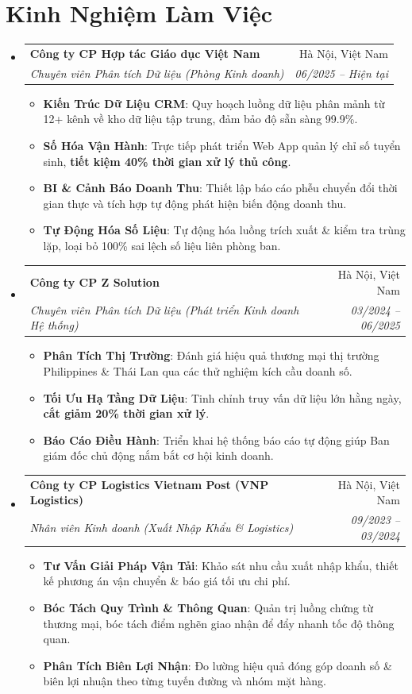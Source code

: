 \documentclass[letterpaper,11pt]{article}
\makeatletter
\newcommand{\resumeItem}[1]{
  \item\small{
    {#1 \vspace{1pt}}
  }
}
\newcommand{\resumeSubheading}[4]{
  \vspace{2pt}\item
    \begin{tabular*}{\textwidth}[t]{l@{\extracolsep{\fill}}r}
      \textbf{#1} & #2 \\
      \textit{\small#3} & \textit{\small #4} \\
    \end{tabular*}\vspace{-2pt}
}
\newcommand{\resumeSubHeadingListStart}{\begin{itemize}[leftmargin=0.15in, label={}]}
\newcommand{\resumeSubHeadingListEnd}{\end{itemize}}
\newcommand{\resumeItemListStart}{\begin{itemize}[leftmargin=0.15in, itemsep=2.5pt, topsep=2pt, parsep=1.5pt]}
\newcommand{\resumeItemListEnd}{\end{itemize}\vspace{2pt}}
\makeatother
\begin{document}
\section*{Kinh Nghiệm Làm Việc}
  \resumeSubHeadingListStart
    \resumeSubheading
      {Công ty CP Hợp tác Giáo dục Việt Nam}{Hà Nội, Việt Nam}
      {Chuyên viên Phân tích Dữ liệu (Phòng Kinh doanh)}{06/2025 -- Hiện tại}
      \resumeItemListStart
      \resumeItem{\textbf{Kiến Trúc Dữ Liệu CRM}: Quy hoạch luồng dữ liệu phân mảnh từ 12+ kênh về kho dữ liệu tập trung, đảm bảo độ sẵn sàng 99.9\%.}
      \resumeItem{\textbf{Số Hóa Vận Hành}: Trực tiếp phát triển Web App quản lý chỉ số tuyển sinh, \textbf{tiết kiệm 40\% thời gian xử lý thủ công}.}
      \resumeItem{\textbf{BI \& Cảnh Báo Doanh Thu}: Thiết lập báo cáo phễu chuyển đổi thời gian thực và tích hợp tự động phát hiện biến động doanh thu.}
      \resumeItem{\textbf{Tự Động Hóa Số Liệu}: Tự động hóa luồng trích xuất \& kiểm tra trùng lặp, loại bỏ 100\% sai lệch số liệu liên phòng ban.}
      \resumeItemListEnd
    \resumeSubheading
      {Công ty CP Z Solution}{Hà Nội, Việt Nam}
      {Chuyên viên Phân tích Dữ liệu (Phát triển Kinh doanh Hệ thống)}{03/2024 -- 06/2025}
      \resumeItemListStart
      \resumeItem{\textbf{Phân Tích Thị Trường}: Đánh giá hiệu quả thương mại thị trường Philippines \& Thái Lan qua các thử nghiệm kích cầu doanh số.}
      \resumeItem{\textbf{Tối Ưu Hạ Tầng Dữ Liệu}: Tinh chỉnh truy vấn dữ liệu lớn hằng ngày, \textbf{cắt giảm 20\% thời gian xử lý}.}
      \resumeItem{\textbf{Báo Cáo Điều Hành}: Triển khai hệ thống báo cáo tự động giúp Ban giám đốc chủ động nắm bắt cơ hội kinh doanh.}
      \resumeItemListEnd
    \resumeSubheading
      {Công ty CP Logistics Vietnam Post (VNP Logistics)}{Hà Nội, Việt Nam}
      {Nhân viên Kinh doanh (Xuất Nhập Khẩu \& Logistics)}{09/2023 -- 03/2024}
      \resumeItemListStart
      \resumeItem{\textbf{Tư Vấn Giải Pháp Vận Tải}: Khảo sát nhu cầu xuất nhập khẩu, thiết kế phương án vận chuyển \& báo giá tối ưu chi phí.}
      \resumeItem{\textbf{Bóc Tách Quy Trình \& Thông Quan}: Quản trị luồng chứng từ thương mại, bóc tách điểm nghẽn giao nhận để đẩy nhanh tốc độ thông quan.}
      \resumeItem{\textbf{Phân Tích Biên Lợi Nhận}: Đo lường hiệu quả đóng góp doanh số \& biên lợi nhuận theo từng tuyến đường và nhóm mặt hàng.}
      \resumeItemListEnd
  \resumeSubHeadingListEnd

\end{document}
